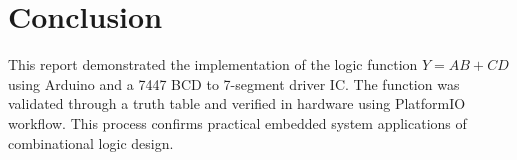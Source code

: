 \documentclass[12pt]{article}
\begin{document}
\section*{Conclusion}
This report demonstrated the implementation of the logic function \(Y = AB + CD\) using Arduino and a 7447 BCD to 7-segment driver IC. The function was validated through a truth table and verified in hardware using PlatformIO workflow. This process confirms practical embedded system applications of combinational logic design.
\end{document}
